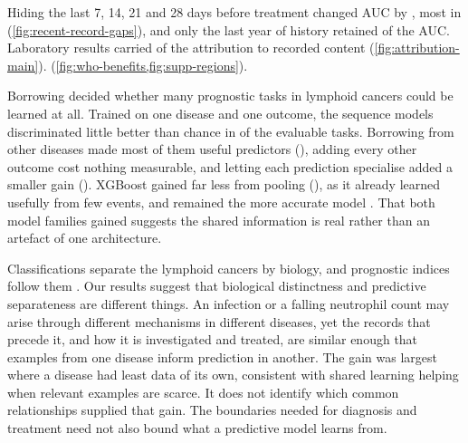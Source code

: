 \FloatBarrier
{}
Hiding the last 7, 14, 21 and 28 days before treatment changed AUC by
, most in 
(\cref{fig:recent-record-gaps}), and only the last year of history retained
 of the AUC. Laboratory results carried
 of the attribution to recorded content
(\cref{fig:attribution-main}). 
(\cref{fig:who-benefits,fig:supp-regions}).

\FloatBarrier
{}
Borrowing decided whether many prognostic tasks in lymphoid cancers could be
learned at all. Trained on one disease and one outcome, the sequence models
discriminated little better than chance in  of the
evaluable tasks. Borrowing from other diseases made most of them useful
predictors (), adding every other outcome cost nothing
measurable, and letting each prediction specialise added a smaller gain
(). XGBoost
gained far less from pooling (), as it already learned
usefully from few events, and remained the more accurate model
. That both model families
gained suggests the shared information is real rather than an artefact of one
architecture.

Classifications separate the lymphoid cancers by biology, and prognostic indices
follow them \citep{alaggio2022who}. Our results suggest that biological
distinctness and predictive separateness are different things. An infection or a
falling neutrophil count may arise through different mechanisms in different
diseases, yet the records that precede it, and how it is investigated and
treated, are similar enough that examples from one disease inform prediction in
another. The gain was largest where a disease had least data of its own, consistent
with shared learning helping when relevant examples are scarce. It does not
identify which common relationships supplied that gain. The boundaries needed
for diagnosis and treatment need not also bound what a predictive model learns
from.

